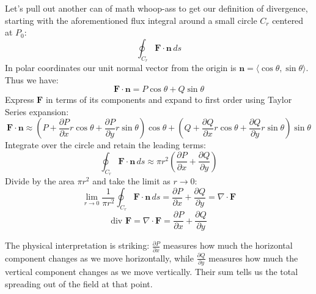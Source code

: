 \noindent Let's pull out another can of math whoop-ass to get our definition of divergence, starting with the aforementioned flux integral around a small circle $C_r$ centered at $P_0$:
\[
\oint_{C_r} \mathbf{F} \cdot \mathbf{n}\,ds
\]
\noindent In polar coordinates our unit normal vector from the origin is $\mathbf{n} = \langle \cos\theta,\sin\theta\rangle$. Thus we have:
\[
\mathbf{F} \cdot \mathbf{n} = P \cos\theta + Q \sin\theta
\]
Express $\mathbf{F}$ in terms of its components and expand to first order using Taylor Series expansion:
\[
\mathbf{F} \cdot \mathbf{n} \approx \left(P + \frac{\partial P}{\partial x} r \cos\theta + \frac{\partial P}{\partial y} r \sin\theta\right)\cos\theta + \left(Q + \frac{\partial Q}{\partial x} r \cos\theta + \frac{\partial Q}{\partial y} r \sin\theta\right)\sin\theta
\]
Integrate over the circle and retain the leading terms:
\[
\oint_{C_r} \mathbf{F} \cdot \mathbf{n}\,ds \approx \pi r^2 \left( \frac{\partial P}{\partial x} + \frac{\partial Q}{\partial y} \right)
\]
Divide by the area $\pi r^2$ and take the limit as $r \to 0$:
\[
\lim_{r \to 0} \frac{1}{\pi r^2} \oint_{C_r} \mathbf{F} \cdot \mathbf{n}\,ds = \frac{\partial P}{\partial x} + \frac{\partial Q}{\partial y} = \nabla \cdot \mathbf{F}
\]
\[
\text{div }\mathbf{F} = \nabla \cdot \mathbf{F} = \frac{\partial P}{\partial x} + \frac{\partial Q}{\partial y}
\]

\noindent The physical interpretation is striking: $\frac{\partial P}{\partial x}$ measures how much the horizontal component changes as we move horizontally, while $\frac{\partial Q}{\partial y}$ measures how much the vertical component changes as we move vertically. Their sum tells us the total spreading out of the field at that point. \\

